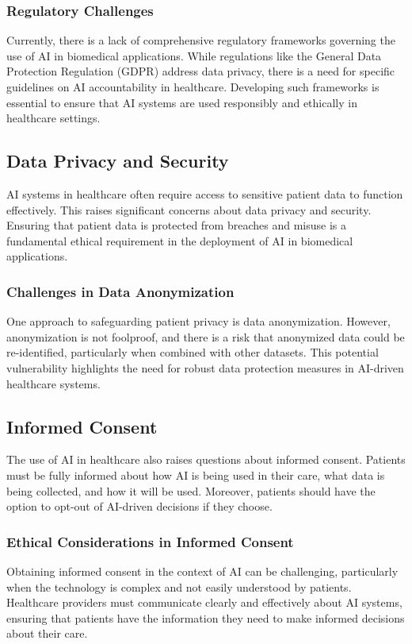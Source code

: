 \documentclass{article}
\begin{document}
\subsubsection{Regulatory Challenges}
Currently, there is a lack of comprehensive regulatory frameworks governing the use of AI in biomedical applications. While regulations like the General Data Protection Regulation (GDPR) address data privacy, there is a need for specific guidelines on AI accountability in healthcare. Developing such frameworks is essential to ensure that AI systems are used responsibly and ethically in healthcare settings.

\subsection{Data Privacy and Security}
AI systems in healthcare often require access to sensitive patient data to function effectively. This raises significant concerns about data privacy and security. Ensuring that patient data is protected from breaches and misuse is a fundamental ethical requirement in the deployment of AI in biomedical applications.

\subsubsection{Challenges in Data Anonymization}
One approach to safeguarding patient privacy is data anonymization. However, anonymization is not foolproof, and there is a risk that anonymized data could be re-identified, particularly when combined with other datasets. This potential vulnerability highlights the need for robust data protection measures in AI-driven healthcare systems.

\subsection{Informed Consent}
The use of AI in healthcare also raises questions about informed consent. Patients must be fully informed about how AI is being used in their care, what data is being collected, and how it will be used. Moreover, patients should have the option to opt-out of AI-driven decisions if they choose.

\subsubsection{Ethical Considerations in Informed Consent}
Obtaining informed consent in the context of AI can be challenging, particularly when the technology is complex and not easily understood by patients. Healthcare providers must communicate clearly and effectively about AI systems, ensuring that patients have the information they need to make informed decisions about their care.
\end{document}
